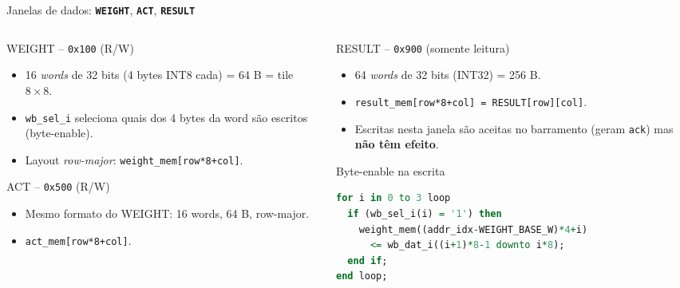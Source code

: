\documentclass[aspectratio=169,10pt]{beamer}
\newcommand{\regname}[1]{\textbf{\texttt{#1}}}
\begin{document}
\begin{frame}[fragile]{Janelas de dados: \regname{WEIGHT}, \regname{ACT}, \regname{RESULT}}
  \small
  \begin{columns}[T]
    \begin{column}{0.5\textwidth}
      \begin{block}{WEIGHT -- \texttt{0x100} (R/W)}
        \begin{itemize}
          \item 16 \emph{words} de 32 bits (4 bytes INT8 cada) = 64 B = tile $8\times8$.
          \item \texttt{wb\_sel\_i} seleciona quais dos 4 bytes da word são escritos
            (byte-enable).
          \item Layout \emph{row-major}: \texttt{weight\_mem[row*8+col]}.
        \end{itemize}
      \end{block}
      \begin{block}{ACT -- \texttt{0x500} (R/W)}
        \begin{itemize}
          \item Mesmo formato do WEIGHT: 16 words, 64 B, row-major.
          \item \texttt{act\_mem[row*8+col]}.
        \end{itemize}
      \end{block}
    \end{column}
    \begin{column}{0.5\textwidth}
      \begin{block}{RESULT -- \texttt{0x900} (somente leitura)}
        \begin{itemize}
          \item 64 \emph{words} de 32 bits (INT32) = 256 B.
          \item \texttt{result\_mem[row*8+col] = RESULT[row][col]}.
          \item Escritas nesta janela são aceitas no barramento (geram \texttt{ack})
            mas \textbf{não têm efeito}.
        \end{itemize}
      \end{block}
      \begin{alertblock}{Byte-enable na escrita}
        \begin{lstlisting}[language=VHDL]
for i in 0 to 3 loop
  if (wb_sel_i(i) = '1') then
    weight_mem((addr_idx-WEIGHT_BASE_W)*4+i)
      <= wb_dat_i((i+1)*8-1 downto i*8);
  end if;
end loop;
        \end{lstlisting}
      \end{alertblock}
    \end{column}
  \end{columns}
\end{frame}
\end{document}
